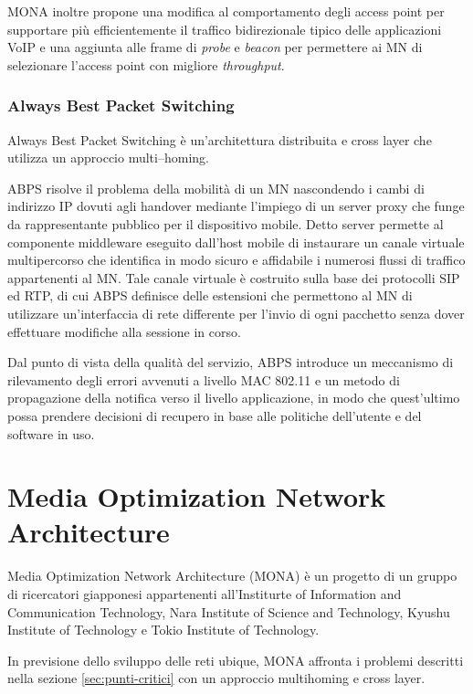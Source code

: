 \documentclass[12pt,a4paper,openright,twoside]{book}
\begin{document}
MONA inoltre propone una modifica al comportamento degli access point
per supportare più efficientemente il traffico bidirezionale tipico
delle applicazioni VoIP e una aggiunta alle frame di \emph{probe} e
\emph{beacon} per permettere ai MN di selezionare l'access point con
migliore \emph{throughput}.


\subsection{Always Best Packet Switching}

Always Best Packet Switching è un'architettura distribuita e cross
layer che utilizza un approccio multi--homing.

ABPS risolve il problema della mobilità di un MN nascondendo i cambi
di indirizzo IP dovuti agli handover mediante l'impiego di un server
proxy che funge da rappresentante pubblico per il dispositivo
mobile. Detto server permette al componente middleware eseguito
dall'host mobile di instaurare un canale virtuale multipercorso che
identifica in modo sicuro e affidabile i numerosi flussi di traffico
appartenenti al MN. Tale canale virtuale è costruito sulla base dei
protocolli SIP ed RTP, di cui ABPS definisce delle estensioni che
permettono al MN di utilizzare un'interfaccia di rete differente per
l'invio di ogni pacchetto senza dover effettuare modifiche alla
sessione in corso.

Dal punto di vista della qualità del servizio, ABPS introduce un
meccanismo di rilevamento degli errori avvenuti a livello MAC 802.11 e
un metodo di propagazione della notifica verso il livello
applicazione, in modo che quest'ultimo possa prendere decisioni di
recupero in base alle politiche dell'utente e del software in uso.

\clearpage{\pagestyle{empty}\cleardoublepage}


\chapter{Media Optimization Network Architecture}
\label{cha:mona}
Media Optimization Network Architecture (MONA) è un progetto di un
gruppo di ricercatori giapponesi appartenenti all'Institurte of
Information and Communication Technology, Nara Institute of Science
and Technology, Kyushu Institute of Technology e Tokio Institute of
Technology.

In previsione dello sviluppo delle reti ubique, MONA affronta i
problemi descritti nella sezione \ref{sec:punti-critici} con un
approccio multihoming e cross layer.
\end{document}
